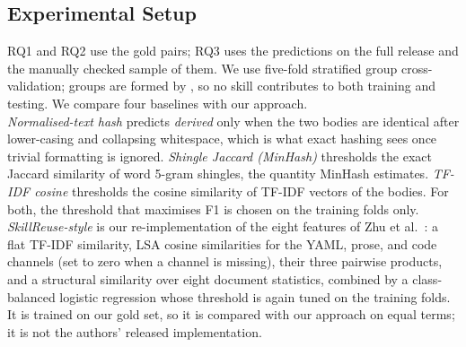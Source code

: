 \documentclass[sigconf,screen]{acmart}
\begin{document}
\subsection{Experimental Setup}
\label{sec:setup}

RQ1 and RQ2 use the \ResGoldPairs{} gold pairs; RQ3 uses the predictions on the full release and the manually checked sample of them. We use five-fold stratified group cross-validation; groups are formed by \ResGrouping{}, so no skill contributes to both training and testing. We compare four baselines with our approach. \\
\emph{Normalised-text hash} predicts \emph{derived} only when the two bodies are identical after lower-casing and collapsing whitespace, which is what exact hashing sees once trivial formatting is ignored. \emph{Shingle Jaccard (MinHash)} thresholds the exact Jaccard similarity of word 5-gram shingles, the quantity MinHash estimates. \emph{TF-IDF cosine} thresholds the cosine similarity of TF-IDF vectors of the bodies. For both, the threshold that maximises F1 is chosen on the training folds only. \emph{SkillReuse-style} is our re-implementation of the eight features of Zhu et al.~\cite{zhu2026skillreuse}: a flat TF-IDF similarity, LSA cosine similarities for the YAML, prose, and code channels (set to zero when a channel is missing), their three pairwise products, and a structural similarity over eight document statistics, combined by a class-balanced logistic regression whose threshold is again tuned on the training folds. It is trained on our gold set, so it is compared with our approach on equal terms; it is not the authors' released implementation.
\end{document}

